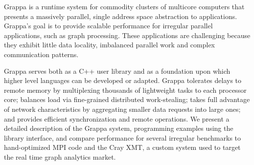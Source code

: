 Grappa is a runtime system for commodity clusters of multicore computers that
presents a massively parallel, single address space abstraction to
applications. Grappa's goal is to provide scalable performance for irregular
parallel applications, such as graph processing. These applications are
challenging because they exhibit little data locality, imbalanced parallel
work and complex communication patterns.

Grappa serves both as a C++ user library and as a foundation upon which higher
level languages can be developed or adapted. Grappa tolerates delays to remote
memory by multiplexing thousands of lightweight tasks to each processor core;
balances load via fine-grained distributed work-stealing; takes full advantage
of network characteristics by aggregating smaller data requests into large
ones; and provides efficient synchronization and remote operations. We present
a detailed description of the Grappa system, programming examples using the
library interface, and compare performance for several irregular benchmarks to
hand-optimized MPI code and the Cray XMT, a custom system used to target the
real time graph analytics market.
